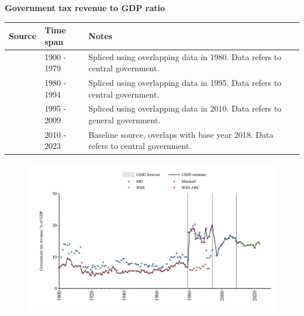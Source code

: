 \documentclass[12pt,a4paper,landscape]{article}
\begin{document}
\begin{adjustbox}{max totalsize={\paperwidth}{\paperheight},center}
\begin{minipage}[t][\textheight][t]{\textwidth}
\vspace*{0.5cm}
{}
\begin{center}
{\Large\bfseries Government tax revenue to GDP ratio}
\end{center}
\vspace{0.5cm}
\begin{table}[H]
\centering
\small
\begin{tabular}{|l|l|l|}
\hline
\textbf{Source} & \textbf{Time span} & \textbf{Notes} \\
\hline
\rowcolor{white}\cite{Mitchell}& 1900 - 1979 &Spliced using overlapping data in 1980. Data refers to central government.\\
\rowcolor{lightgray}\cite{WDI_ARC}& 1980 - 1994 &Spliced using overlapping data in 1995. Data refers to central government.\\
\rowcolor{white}\cite{MD}& 1995 - 2009 &Spliced using overlapping data in 2010. Data refers to general government.\\
\rowcolor{lightgray}\cite{WDI}& 2010 - 2023 &Baseline source, overlaps with base year 2018. Data refers to central government.\\
\hline
\end{tabular}
\end{table}
\begin{figure}[H]
\centering
\includegraphics[width=\textwidth,height=0.6\textheight,keepaspectratio]{graphs/BRA_govtax_GDP.pdf}
\end{figure}
\end{minipage}
\end{adjustbox}
\end{document}
